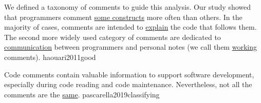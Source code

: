\documentclass{article}
\begin{document}

  {We defined a taxonomy of comments to guide this analysis. Our study showed that programmers comment \ul{some constructs} more often than others. In the majority of cases, comments are intended to \ul{explain} the code that follows them. The second more widely used category of comments are dedicated to \ul{communication} between programmers and personal notes (we call them \ul{working} comments).}
  {haouari2011good}



  {Code comments contain valuable information to support software development, especially during code reading and code maintenance. Nevertheless, not all the comments are the \ul{same}.}
  {pascarella2019classifying}
\end{document}
